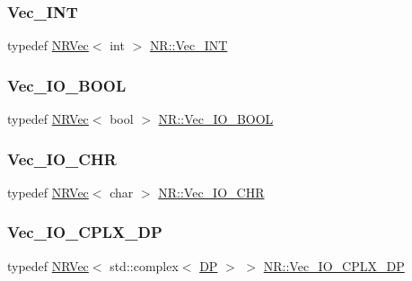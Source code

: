 \mbox{\label{namespaceNR_a8ee8e979fd889af3f190d7f678756f24}} 
\subsubsection{\texorpdfstring{Vec\_INT}{Vec\_INT}}
{\footnotesize\ttfamily typedef \mbox{\hyperlink{classNR_1_1NRVec}{N\+R\+Vec}}$<$ int $>$ \mbox{\hyperlink{namespaceNR_a8ee8e979fd889af3f190d7f678756f24}{N\+R\+::\+Vec\+\_\+\+I\+NT}}}

\mbox{\label{namespaceNR_ab48f823aa1c29bd5b75b57ca8b6f7eb5}} 
\subsubsection{\texorpdfstring{Vec\_IO\_BOOL}{Vec\_IO\_BOOL}}
{\footnotesize\ttfamily typedef \mbox{\hyperlink{classNR_1_1NRVec}{N\+R\+Vec}}$<$ bool $>$ \mbox{\hyperlink{namespaceNR_ab48f823aa1c29bd5b75b57ca8b6f7eb5}{N\+R\+::\+Vec\+\_\+\+I\+O\+\_\+\+B\+O\+OL}}}

\mbox{\label{namespaceNR_a7486678c75d124d88a5ad22efbcd737e}} 
\subsubsection{\texorpdfstring{Vec\_IO\_CHR}{Vec\_IO\_CHR}}
{\footnotesize\ttfamily typedef \mbox{\hyperlink{classNR_1_1NRVec}{N\+R\+Vec}}$<$ char $>$ \mbox{\hyperlink{namespaceNR_a7486678c75d124d88a5ad22efbcd737e}{N\+R\+::\+Vec\+\_\+\+I\+O\+\_\+\+C\+HR}}}

\mbox{\label{namespaceNR_a5f15a34fe35c8311d00b61d4483a203e}} 
\subsubsection{\texorpdfstring{Vec\_IO\_CPLX\_DP}{Vec\_IO\_CPLX\_DP}}
{\footnotesize\ttfamily typedef \mbox{\hyperlink{classNR_1_1NRVec}{N\+R\+Vec}}$<$ std\+::complex$<$ \mbox{\hyperlink{namespaceNR_af6ff762dd605ff477b8e52387253a02a}{DP}} $>$ $>$ \mbox{\hyperlink{namespaceNR_a5f15a34fe35c8311d00b61d4483a203e}{N\+R\+::\+Vec\+\_\+\+I\+O\+\_\+\+C\+P\+L\+X\+\_\+\+DP}}}

